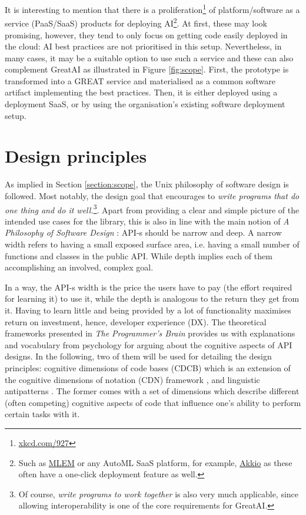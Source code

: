 It is interesting to mention that there is a proliferation\footnote{\href{https://xkcd.com/927/}{xkcd.com/927}} of platform/software as a service (PaaS/SaaS) products for deploying AI\footnote{Such as \href{https://mlem.ai/}{MLEM} or any AutoML SaaS platform, for example, \href{https://www.akkio.com/role/software-engineers}{Akkio} as these often have a one-click deployment feature as well.}. At first, these may look promising, however, they tend to only focus on getting code easily deployed in the cloud: AI best practices are not prioritised in this setup. Nevertheless, in many cases, it may be a suitable option to use such a service and these can also complement GreatAI as illustrated in Figure \ref{fig:scope}. First, the prototype is transformed into a GREAT service and materialised as a common software artifact implementing the best practices. Then, it is either deployed using a deployment SaaS, or by using the organisation's existing software deployment setup.

\section{Design principles}

As implied in Section \ref{section:scope}, the Unix philosophy \cite{ritchie1978unix,salus1994quarter} of software design is followed. Most notably, the design goal that encourages to \textit{write programs that do one thing and do it well.}\footnote{Of course, \textit{write programs to work together} is also very much applicable, since allowing interoperability is one of the core requirements for GreatAI.}. Apart from providing a clear and simple picture of the intended use cases for the library, this is also in line with the main notion of \textit{A Philosophy of Software Design} \cite{ousterhout2018philosophy}: API-s should be narrow and deep. A narrow width refers to having a small exposed surface area, i.e. having a small number of functions and classes in the public API. While depth implies each of them accomplishing an involved, complex goal. 

In a way, the API-s width is the price the users have to pay (the effort required for learning it) to use it, while the depth is analogous to the return they get from it. Having to learn little and being provided by a lot of functionality maximises return on investment, hence, developer experience (DX). The theoretical frameworks presented in \textit{The Programmer's Brain} \cite{hermans2021programmer} provides us with explanations and vocabulary from psychology for arguing about the cognitive aspects of API designs. In the following, two of them will be used for detailing the design principles: cognitive dimensions of code bases (CDCB) which is an extension of the cognitive dimensions of notation (CDN) framework \cite{blackwell2001cognitive}, and linguistic antipatterns \cite{arnaoudova2016linguistic}. The former comes with a set of dimensions which describe different (often competing) cognitive aspects of code that influence one's ability to perform certain tasks with it.

